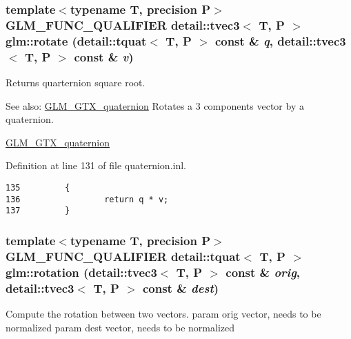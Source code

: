 \hypertarget{group__gtx__quaternion_g3b9f985e75b852e9526d5c088a50c3d4}{
\subsubsection[rotate]{\setlength{\rightskip}{0pt plus 5cm}template$<$typename T, precision P$>$ GLM\_\-FUNC\_\-QUALIFIER detail::tvec3$<$ T, P $>$ glm::rotate (detail::tquat$<$ T, P $>$ const \& {\em q}, \/  detail::tvec3$<$ T, P $>$ const \& {\em v})}}
\label{group__gtx__quaternion_g3b9f985e75b852e9526d5c088a50c3d4}


Returns quarternion square root.

\begin{Desc}
\item[See also:]\hyperlink{group__gtx__quaternion}{GLM\_\-GTX\_\-quaternion} Rotates a 3 components vector by a quaternion.

\hyperlink{group__gtx__quaternion}{GLM\_\-GTX\_\-quaternion} \end{Desc}


Definition at line 131 of file quaternion.inl.

\begin{Code}\begin{verbatim}135         {
136                 return q * v;
137         }
\end{verbatim}
\end{Code}


\hypertarget{group__gtx__quaternion_gf7a15242ef69e5c997df231b28b92cef}{
\subsubsection[rotation]{\setlength{\rightskip}{0pt plus 5cm}template$<$typename T, precision P$>$ GLM\_\-FUNC\_\-QUALIFIER detail::tquat$<$ T, P $>$ glm::rotation (detail::tvec3$<$ T, P $>$ const \& {\em orig}, \/  detail::tvec3$<$ T, P $>$ const \& {\em dest})}}
\label{group__gtx__quaternion_gf7a15242ef69e5c997df231b28b92cef}


Compute the rotation between two vectors. param orig vector, needs to be normalized param dest vector, needs to be normalized


